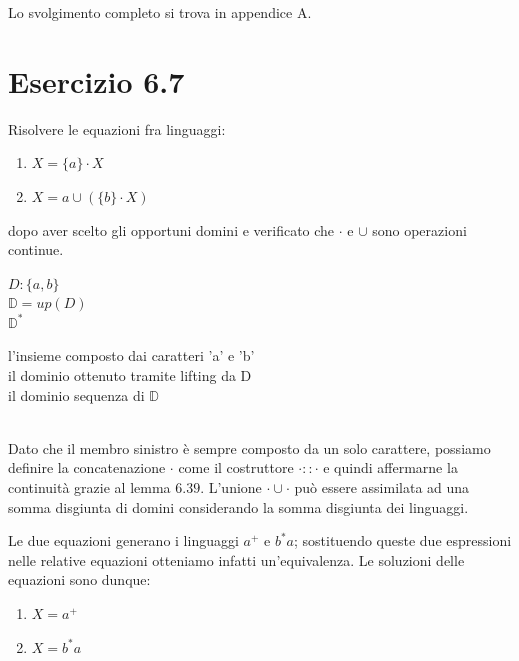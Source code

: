 		Lo svolgimento completo si trova in appendice A.
		
		\newpage
	
	\section{Esercizio 6.7}
		\qquad Risolvere le equazioni fra linguaggi:
		\begin{enumerate}
		  \item $X = \{a\} \cdot X$
		  \item $X = {a} \cup (\{b\} \cdot X)$
		\end{enumerate}
		dopo aver scelto gli opportuni domini e verificato che $\cdot$ e $\cup$ sono
		operazioni continue.
		
		\sectionline
		
		\begin{minipage}{0.2\linewidth}
			\begin{flushleft}
				$D:\{a,b\}$\\
				$\mathbb{D} = up(D)$\\
				$\mathbb{D}^*$
			\end{flushleft}
		\end{minipage}
		\hfill
		\begin{minipage}{0.7\linewidth}
			\begin{flushright}
				l'insieme composto dai caratteri 'a' e 'b'\\
				il dominio ottenuto tramite lifting da D\\
				il dominio sequenza di $\mathbb{D}$
			\end{flushright}
		\end{minipage}\\
		
		Dato che il membro sinistro \`e sempre composto da un solo carattere,
		possiamo definire la concatenazione $\cdot$ come il costruttore $\cdot ::
		\cdot$ e quindi affermarne la continuità grazie al lemma $6.39$. L'unione
		$\cdot\cup\cdot$ pu\`{o} essere assimilata ad una somma disgiunta di domini
		considerando la somma disgiunta dei linguaggi.
		
		Le due equazioni generano i linguaggi $a^+$ e $b^*a$; sostituendo queste due
		espressioni nelle relative equazioni otteniamo infatti un'equivalenza. Le
		soluzioni delle equazioni sono dunque:
		
		\begin{enumerate}
		  \item $X = a^+$
		  \item $X = b^*a$
		\end{enumerate}
		
